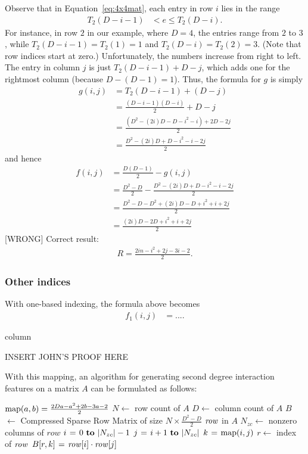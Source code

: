 \documentclass[11pt]{article}
\begin{document}
Observe that in Equation~\ref{eq:4x4mat}, each entry in row $i$ lies in the range
\begin{align}
T_2(D-i-1) &< e \le T_2(D-i).
\end{align}
\noindent
For instance, in row $2$ in our example, where $D = 4$, the entries range from $2$ to $3$, while $T_2(D-i-1) = T_2(1) = 1$ and $T_2(D-i) = T_2(2) = 3$. (Note that row indices start at zero.) Unfortunately, the numbers increase from right to left. The entry in column $j$ is just $T_2(D-i-1) + D-j$, which adds one for the rightmost column (because $D - (D-1) = 1$). 
Thus, the formula for $g$ is simply
\begin{align}
g(i, j) 
&= T_2(D-i-1) + (D-j) \\
&= \frac{(D-i-1)(D-i)}{2} + D-j \\
&= \frac{(D^2 - (2i)D - D - i^2 - i) + 2D - 2j}{2} \\
&= \frac{D^2 - (2i)D + D - i^2 - i - 2j}{2}
\end{align}
and hence 
\begin{align}
f(i, j) 
&= \frac{D(D-1)}{2} - g(i,j) \\
&= \frac{D^2-D}{2} - \frac{D^2 - (2i)D + D - i^2 - i - 2j}{2}\\
&= \frac{D^2-D - D^2 + (2i)D - D + i^2 + i + 2j}{2}\\
&= \frac{(2i)D - 2D + i^2 + i + 2j}{2}
\end{align}
[WRONG]
Correct result:
\begin{align}
R = \frac{ 2in - i^2  + 2j - 3i - 2}{2}.
\end{align}
\subsubsection{Other indices}
With one-based indexing, the formula above becomes
\begin{align}
f_1(i, j) &= ....
\end{align}





  column 


INSERT JOHN'S PROOF HERE

With this mapping, an algorithm for generating second degree interaction features on a 
matrix $A$ can be formulated as follows:

\begin{codebox}
    \zi $\func{map}(a, b) = \frac{2Da-a^2+2b-3a-2}{2}$
    \zi $N \gets$ row count of $A$
    \zi $D \gets$ column count of $A$
    \zi $B$ $\gets$ Compressed Sparse Row Matrix of size $N \times \frac{D^2-D}{2}$
    \zi \For $\id{row}$ in $A$ \Do
    \zi     $N_{zc} \gets$ nonzero columns of $row$
    \zi     \For $i \gets 0 \To |N_{zc}|-1$ \Do
    \zi         \For $j \gets i+1 \To |N_{zc}|$ \Do
    \zi             $k \gets \func{map}(i, j)$
    \zi             $r \gets$ index of $\id{row}$
    \zi             $B[r, k] \gets \id{row}[i] \cdot \id{row}[j]$
                \End
            \End
       	\End
\end{codebox}
\end{document}

